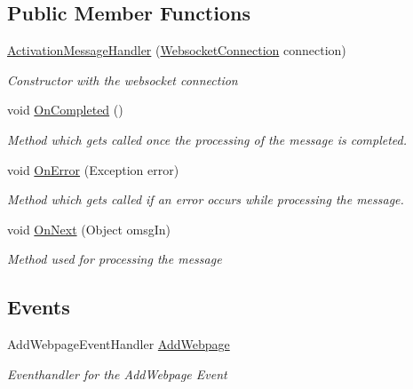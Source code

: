\subsection*{Public Member Functions}
\begin{DoxyCompactItemize}
\item 
\hyperlink{class_web_analyzer_1_1_server_1_1_message_handler_1_1_activation_message_handler_aa05ee6b24b05ef071e0f4fe6186f581c}{Activation\+Message\+Handler} (\hyperlink{class_web_analyzer_1_1_server_1_1_websocket_connection}{Websocket\+Connection} connection)
\begin{DoxyCompactList}\small\item\em Constructor with the websocket connection \end{DoxyCompactList}\item 
void \hyperlink{class_web_analyzer_1_1_server_1_1_message_handler_1_1_activation_message_handler_a7a5fa265a93c6f2b3aa97ddc1a1ab018}{On\+Completed} ()
\begin{DoxyCompactList}\small\item\em Method which gets called once the processing of the message is completed. \end{DoxyCompactList}\item 
void \hyperlink{class_web_analyzer_1_1_server_1_1_message_handler_1_1_activation_message_handler_af0709f385ad61869e7f5b3d04d9a5a78}{On\+Error} (Exception error)
\begin{DoxyCompactList}\small\item\em Method which gets called if an error occurs while processing the message. \end{DoxyCompactList}\item 
void \hyperlink{class_web_analyzer_1_1_server_1_1_message_handler_1_1_activation_message_handler_a5dc2879ba556e923bb24a7d5cb36d322}{On\+Next} (Object omsg\+In)
\begin{DoxyCompactList}\small\item\em Method used for processing the message \end{DoxyCompactList}\end{DoxyCompactItemize}
\subsection*{Events}
\begin{DoxyCompactItemize}
\item 
Add\+Webpage\+Event\+Handler \hyperlink{class_web_analyzer_1_1_server_1_1_message_handler_1_1_activation_message_handler_aeab84864e057b34b024a8b8a11f3e135}{Add\+Webpage}
\begin{DoxyCompactList}\small\item\em Eventhandler for the Add\+Webpage Event \end{DoxyCompactList}\end{DoxyCompactItemize}
